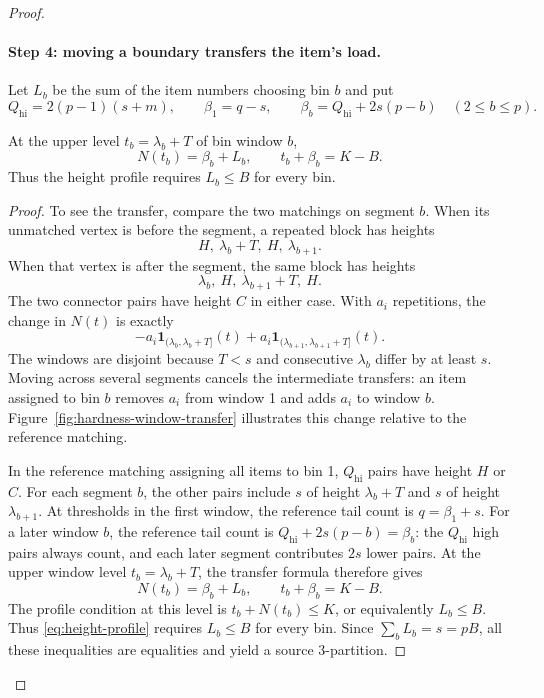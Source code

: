 \begin{proof}
\paragraph{Step 4: moving a boundary transfers the item's load.}
Let $L_b$ be the sum of the item numbers choosing bin $b$ and put
\[
 Q_{\mathrm{hi}}=2(p-1)(s+m),\qquad
 \beta_1=q-s,\qquad
 \beta_b=Q_{\mathrm{hi}}+2s(p-b)\quad(2\le b\le p).
\]
\begin{claim}
At the upper level $t_b=\lambda_b+T$ of bin window $b$,
\[
 N(t_b)=\beta_b+L_b,\qquad t_b+\beta_b=K-B.
\]
Thus the height profile requires $L_b\le B$ for every bin.
\end{claim}
\begin{proof}
To see the transfer, compare the two matchings on segment $b$.
When its unmatched vertex is before the segment, a repeated block
has heights
\[
 H,\ \lambda_b+T,\ H,\ \lambda_{b+1}.
\]
When that vertex is after the segment, the same block has heights
\[
 \lambda_b,\ H,\ \lambda_{b+1}+T,\ H.
\]
The two connector pairs have height $C$ in either case.
With $a_i$ repetitions, the change in $N(t)$ is exactly
\[
 -a_i\mathbf1_{(\lambda_b,\lambda_b+T]}(t)+
  a_i\mathbf1_{(\lambda_{b+1},\lambda_{b+1}+T]}(t).
\]
The windows are disjoint because $T<s$ and consecutive
$\lambda_b$ differ by at least $s$.
Moving across several segments cancels the intermediate transfers:
an item assigned to bin $b$ removes $a_i$ from window 1 and
adds $a_i$ to window $b$. Figure~\ref{fig:hardness-window-transfer}
illustrates this change relative to the reference matching.

In the reference matching assigning all items to bin 1,
$Q_{\mathrm{hi}}$ pairs have height $H$ or $C$.
For each segment $b$, the other pairs include $s$ of height
$\lambda_b+T$ and $s$ of height $\lambda_{b+1}$.
At thresholds in the first window, the reference tail count is
$q=\beta_1+s$. For a later window $b$, the reference tail count is
$Q_{\mathrm{hi}}+2s(p-b)=\beta_b$: the $Q_{\mathrm{hi}}$ high pairs
always count, and each later segment contributes $2s$ lower pairs.
At the upper window level $t_b=\lambda_b+T$, the transfer formula
therefore gives
\[
 N(t_b)=\beta_b+L_b,\qquad t_b+\beta_b=K-B.
\]
The profile condition at this level is
$t_b+N(t_b)\le K$, or equivalently $L_b\le B$.
Thus \eqref{eq:height-profile} requires $L_b\le B$ for every bin.
Since $\sum_b L_b=s=pB$, all these inequalities are equalities
and yield a source 3-partition.
\end{proof}


\end{proof}
